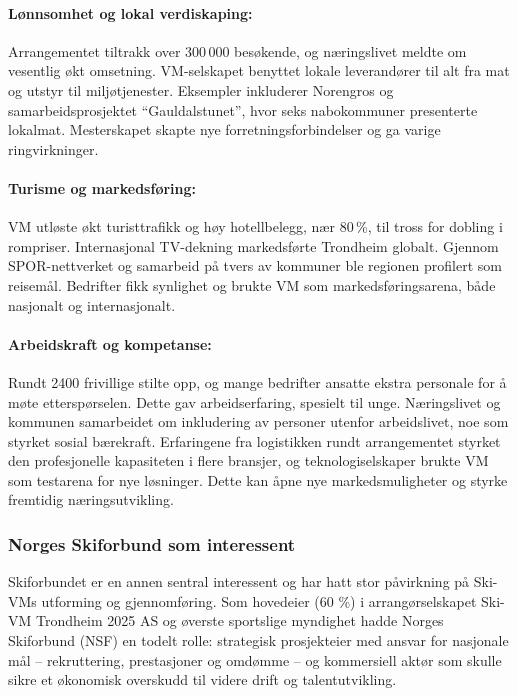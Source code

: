 \paragraph{Lønnsomhet og lokal verdiskaping:} Arrangementet tiltrakk over 300\,000
besøkende\cite{Norengros2024}, og næringslivet meldte om vesentlig økt omsetning.
VM-selskapet benyttet lokale leverandører til alt fra mat og utstyr til miljøtjenester.
Eksempler inkluderer Norengros og samarbeidsprosjektet “Gauldalstunet”, hvor seks
nabokommuner presenterte lokalmat\cite{NiT2024}. Mesterskapet skapte nye
forretningsforbindelser og ga varige ringvirkninger.

\paragraph{Turisme og markedsføring:} VM utløste økt turisttrafikk og høy hotellbelegg, nær 80\,\%,
til tross for dobling i rompriser\cite{Finansavisen2025}. Internasjonal TV-dekning
markedsførte Trondheim globalt. Gjennom SPOR-nettverket og samarbeid på tvers av kommuner
ble regionen profilert som reisemål\cite{NiT2024}. Bedrifter fikk synlighet og brukte VM
som markedsføringsarena, både nasjonalt og internasjonalt.



\paragraph{Arbeidskraft og kompetanse:} Rundt 2400 frivillige stilte
opp\cite{TrondheimKommune2023}, og mange bedrifter ansatte ekstra personale for å møte
etterspørselen. Dette gav arbeidserfaring, spesielt til unge. Næringslivet og kommunen
samarbeidet om inkludering av personer utenfor arbeidslivet, noe som styrket sosial bærekraft.
Erfaringene fra logistikken rundt arrangementet styrket den profesjonelle kapasiteten
i flere bransjer, og teknologiselskaper brukte VM som testarena for nye løsninger.
Dette kan åpne nye markedsmuligheter og styrke fremtidig næringsutvikling.


\subsubsection{Norges Skiforbund som interessent}
Skiforbundet er en annen sentral interessent og har hatt stor påvirkning på Ski-VMs utforming
og gjennomføring. Som hovedeier (60 \%) i arrangørselskapet Ski-VM Trondheim 2025 AS og øverste
sportslige myndighet hadde Norges Skiforbund (NSF) en todelt rolle: strategisk prosjekteier med
ansvar for nasjonale mål -- rekruttering, prestasjoner og omdømme -- og kommersiell aktør som
skulle sikre et økonomisk overskudd til videre drift og talentutvikling\cite{ProffSkiVM2025}.

